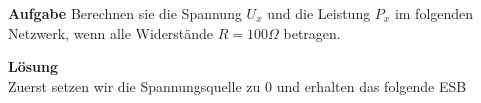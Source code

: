 										 \beginbsp
											\textbf{Aufgabe} Berechnen sie die Spannung $U_x$ und die Leistung $P_x$ im folgenden Netzwerk, wenn alle Widerstände $ R = 100 \Omega$ betragen. \\
											\begin{center}
												\fix
											\end{center}
											\iend

											\beginip
											\textbf{Lösung}
											\\
											Zuerst setzen wir die Spannungsquelle zu 0 und erhalten das folgende ESB \\
											\begin{center}
												\fix
											\end{center}

